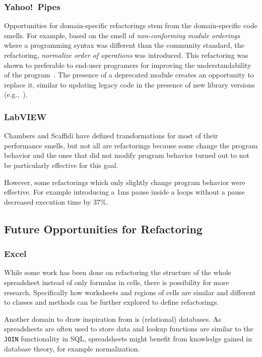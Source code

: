 \documentclass[10pt,conference,compsocconf]{IEEEtran}
\begin{document}
\subsubsection{Yahoo!\ Pipes}
\label{sec:yp:domainrefactor}
Opportunities for domain-specific refactorings stem from the domain-specific code smells. 
For example, based on the smell of \emph{non-conforming module orderings} where a programming syntax was different than the community standard, the refactoring, \emph{normalize order of operations} was introduced. This refactoring was shown to preferable to end-user programers for improving the understandability of the program~\cite{StoleeTSE2013}. 
The presence of a deprecated module creates an opportunity to 
replace it, similar to updating legacy code in the presence of new library versions (e.g.,~\cite{Tansey:2008:ARI:1449955.1449788, Balaban:2005:RSC:1103845.1094832}). 


\subsubsection{LabVIEW}

Chambers and Scaffidi \cite{chambers2015impact} have defined transformations for most of their performance smells, but not all are refactorings because some change the program behavior and the ones that did not modify program behavior turned out to not be particularly effective for this goal.

However, some refactorings which only slightly change program behavior were effective. For example introducing a 1ms pause inside a loops without a pause decreased execution time by 37\%.

\subsection{Future Opportunities for Refactoring}
\subsubsection{Excel}

While some work has been done on refactoring the structure of the whole spreadsheet instead of only formulas in cells, there is possibility for more research. 
Specifically how worksheets and regions of cells are similar and different to classes and methods can be further explored to define refactorings.

Another domain to draw inspiration from is (relational) databases.
As spreadsheets are often used to store data and lookup functions are similar to the \texttt{JOIN} functionality in SQL, spreadsheets might benefit from knowledge gained in database theory, for example normalization.
\end{document}
